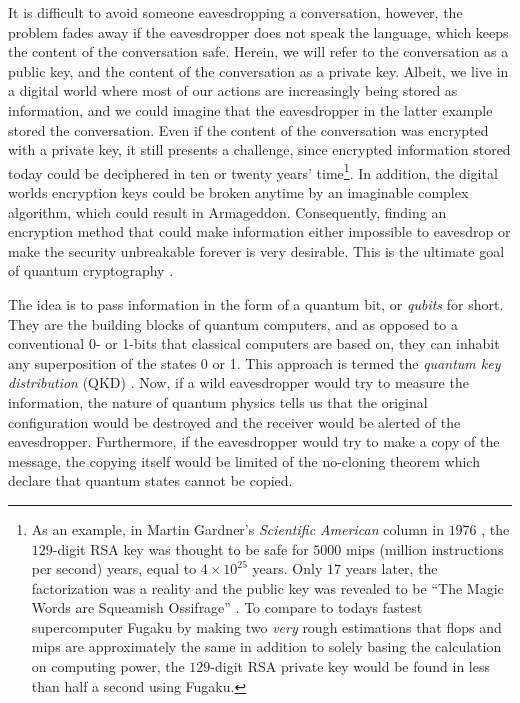 It is difficult to avoid someone eavesdropping a conversation, however, the problem fades away if the eavesdropper does not speak the language, which keeps the content of the conversation safe. Herein, we will refer to the conversation as a public key, and the content of the conversation as a private key. Albeit, we live in a digital world where most of our actions are increasingly being stored as information, and we could imagine that the eavesdropper in the latter example stored the conversation. Even if the content of the conversation was encrypted with a private key, it still presents a challenge, since encrypted information stored today could be deciphered in ten or twenty years' time\footnote{As an example, in Martin Gardner's \textit{Scientific American} column in $1976$ \cite{Taubes1994}, the $129$-digit RSA key was thought to be safe for $5000$ mips (million instructions per second) years, equal to $4 \times 10^{25}$ years. Only $17$ years later, the factorization was a reality and the public key was revealed to be ``The Magic Words are Squeamish Ossifrage'' \cite{Atkins1995}. To compare to todays fastest supercomputer Fugaku \cite{Top500} by making two \textit{very} rough estimations that flops and mips are approximately the same in addition to solely basing the calculation on computing power, the $129$-digit RSA private key would be found in less than half a second using Fugaku.}. In addition, the digital worlds encryption keys could be broken anytime by an imaginable complex algorithm, which could result in Armageddon. Consequently, finding an encryption method that could make information either impossible to eavesdrop or make the security unbreakable forever is very desirable. This is the ultimate goal of quantum cryptography \cite{Pavicic2006}.



The idea is to pass information in the form of a quantum bit, or \textit{qubits} for short. They are the building blocks of quantum computers, and as opposed to a conventional 0- or 1-bits that classical computers are based on, they can inhabit any superposition of the states 0 or 1. This approach is termed the \textit{quantum key distribution} (QKD) \cite{Gisin2002, Gisin2007}. Now, if a wild eavesdropper would try to measure the information, the nature of quantum physics tells us that the original configuration would be destroyed and the receiver would be alerted of the eavesdropper. Furthermore, if the eavesdropper would try to make a copy of the message, the copying itself would be limited of the no-cloning theorem \cite{Gisin2002} which declare that quantum states cannot be copied.

